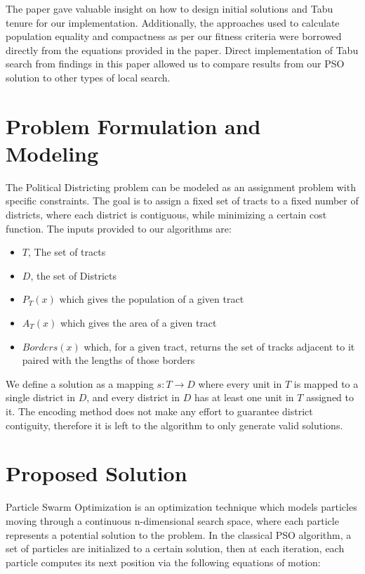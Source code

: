 \documentclass[journal]{IEEEtran}
\begin{document}
The paper gave valuable insight on how to design initial solutions and
Tabu tenure for our implementation. Additionally, the approaches used to
calculate population equality and compactness as per our fitness criteria
were borrowed directly from the equations provided in the paper. Direct
implementation of Tabu search from findings in this paper allowed us to
compare results from our PSO solution to other types of local search.

\section{Problem Formulation and Modeling}
The Political Districting problem can be modeled as an assignment problem with
specific constraints.  The goal is to assign a fixed set of tracts to a fixed
number of districts, where each district is contiguous, while minimizing a
certain cost function.  The inputs provided to our algorithms are:

\begin{itemize}
\item $T$, The set of tracts
\item $D$, the set of Districts
\item $P_T(x)$ which gives the population of a given tract
\item $A_T(x)$ which gives the area of a given tract
\item $Borders(x)$ which, for a given tract, returns the set of tracks adjacent to it paired with the lengths of those borders
\end{itemize}

We define a solution as a mapping $s: T \rightarrow D$ where every unit in $T$
is mapped to a single district in $D$, and every district in $D$ has at least
one unit in $T$ assigned to it.  The encoding method does not make any effort to
guarantee district contiguity, therefore it is left to the algorithm to only
generate valid solutions.

\section{Proposed Solution}
\label{sec:proposed_solution}
Particle Swarm Optimization is an optimization technique which models particles
moving through a continuous n-dimensional search space, where each particle
represents a potential solution to the problem.  In the classical PSO algorithm,
a set of particles are initialized to a certain solution, then at each
iteration, each particle computes its next position via the following equations
of motion:
\end{document}
